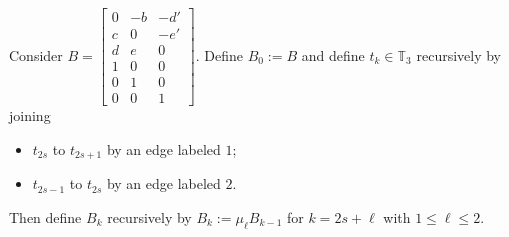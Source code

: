 \documentclass{amsart}
\numberwithin{theorem}{section}
\newcommand{\TT}{\mathbb{T}}
\begin{document}
  Consider $B=\left[\begin{array}{ccc} 0 & -b & -d' \\ c & 0 & -e'\\ d & e & 0\\ 1 & 0 & 0\\ 0 & 1 & 0\\ 0 & 0 & 1\end{array}\right]$.
  Define $B_0:=B$ and define $t_k\in\TT_3$ recursively by joining 
  \begin{itemize}
    \item $t_{2s}$ to $t_{2s+1}$ by an edge labeled $1$;
    \item $t_{2s-1}$ to $t_{2s}$ by an edge labeled $2$.
  \end{itemize}
  Then define $B_k$ recursively by $B_k:=\mu_\ell B_{k-1}$ for $k=2s+\ell$ with $1\le\ell\le 2$.
\end{document}
